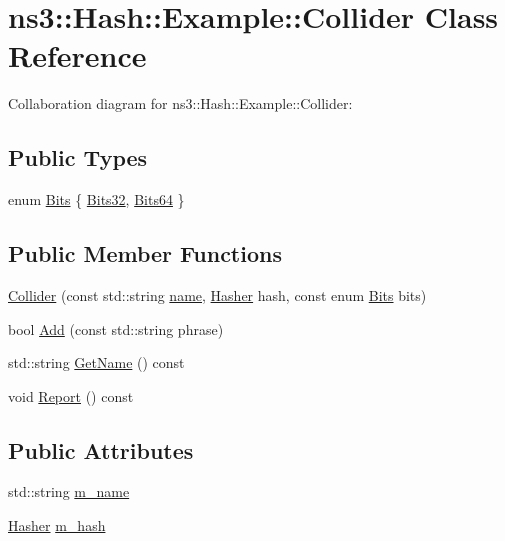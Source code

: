 \hypertarget{classns3_1_1Hash_1_1Example_1_1Collider}{}\section{ns3\+:\+:Hash\+:\+:Example\+:\+:Collider Class Reference}
\label{classns3_1_1Hash_1_1Example_1_1Collider}


Collaboration diagram for ns3\+:\+:Hash\+:\+:Example\+:\+:Collider\+:
\subsection*{Public Types}
\begin{DoxyCompactItemize}
\item 
enum \hyperlink{classns3_1_1Hash_1_1Example_1_1Collider_ab11d49d7dad015a33d1b6c17b3073572}{Bits} \{ \hyperlink{classns3_1_1Hash_1_1Example_1_1Collider_ab11d49d7dad015a33d1b6c17b3073572ae52d27313381d9a1450d83f165f01d53}{Bits32}, 
\hyperlink{classns3_1_1Hash_1_1Example_1_1Collider_ab11d49d7dad015a33d1b6c17b3073572ae083b309fec17b24697e3477ee5348cd}{Bits64}
 \}
\end{DoxyCompactItemize}
\subsection*{Public Member Functions}
\begin{DoxyCompactItemize}
\item 
\hyperlink{classns3_1_1Hash_1_1Example_1_1Collider_a9fdaeec60c69320145691ee76c102654}{Collider} (const std\+::string \hyperlink{generate__test__data__lte__spectrum__model_8m_ab74e6bf80237ddc4109968cedc58c151}{name}, \hyperlink{classns3_1_1Hasher}{Hasher} hash, const enum \hyperlink{classns3_1_1Hash_1_1Example_1_1Collider_ab11d49d7dad015a33d1b6c17b3073572}{Bits} bits)
\item 
bool \hyperlink{classns3_1_1Hash_1_1Example_1_1Collider_ab805dca91262adca1590124759c0c947}{Add} (const std\+::string phrase)
\item 
std\+::string \hyperlink{classns3_1_1Hash_1_1Example_1_1Collider_ae812f56d95724df56ad86f6f035cc663}{Get\+Name} () const 
\item 
void \hyperlink{classns3_1_1Hash_1_1Example_1_1Collider_aeb0de699b9f857d7fe18296f456a88f2}{Report} () const 
\end{DoxyCompactItemize}
\subsection*{Public Attributes}
\begin{DoxyCompactItemize}
\item 
std\+::string \hyperlink{classns3_1_1Hash_1_1Example_1_1Collider_a8242a1b153b1e6ab40c37e6c0e6fb05a}{m\+\_\+name}
\item 
\hyperlink{classns3_1_1Hasher}{Hasher} \hyperlink{classns3_1_1Hash_1_1Example_1_1Collider_a05ce889c89d4ccb89ad600126d00b04c}{m\+\_\+hash}
\end{DoxyCompactItemize}
